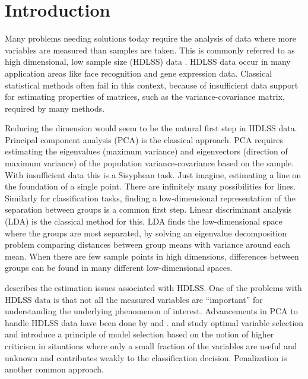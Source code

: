 \section{Introduction} 

Many problems needing solutions today require the analysis of data where more variables are measured than samples are taken. This is commonly referred to as high dimensional, low sample size (HDLSS) data \citep{hall:2005, marron:2007}. %
HDLSS data occur in many application areas like face recognition and gene expression data. Classical statistical methods often fail in this context, because of insufficient data support for estimating properties of matrices, such as the variance-covariance matrix, required by many methods. 

Reducing the dimension would seem to be the natural first step in HDLSS data. Principal component analysis (PCA) is the classical approach. PCA requires estimating the eigenvalues (maximum variance) and eigenvectors (direction of maximum variance) of the population variance-covariance based on the sample. With insufficient data this is a Sisyphean task. Just imagine, estimating a line on the foundation of a single point. There are infinitely many possibilities for lines. Similarly for classification tasks, finding a low-dimensional representation of the separation between groups is a common first step. Linear discriminant analysis (LDA) is the classical method for this. LDA finds the low-dimensional space where the groups are most separated, by solving an eigenvalue decomposition problem comparing distances between group means with variance around each mean. When there are few sample points in high dimensions, differences between groups can be found in many different low-dimensional spaces. 

\cite{marron:2007} describes the estimation issues associated with HDLSS.  
One of the problems with HDLSS data is that not all the measured variables are ``important'' for understanding the underlying phenomenon of interest. Advancements in PCA to handle HDLSS data have been done by \cite{marron:2011} and \cite{yata:2010}. \cite{donoho:2009} and \cite{donoho:2008} study optimal variable selection and introduce a principle of model selection based on the notion of higher criticism in situations where only a small fraction of the variables are useful and unknown and contributes weakly to the classification decision. Penalization \citep[e.g.][]{witten:2011, lee:2009} is another common approach.

